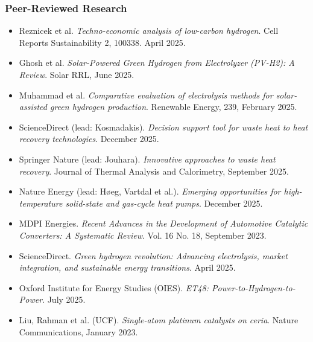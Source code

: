 \documentclass[11pt,letterpaper]{article}
\begin{document}
\subsubsection{Peer-Reviewed Research}
\begin{itemize}
  \item Reznicek et al. \textit{Techno-economic analysis of low-carbon hydrogen}. Cell Reports Sustainability 2, 100338. April 2025.
  \item Ghosh et al. \textit{Solar-Powered Green Hydrogen from Electrolyzer (PV-H2): A Review}. Solar RRL, June 2025.
  \item Muhammad et al. \textit{Comparative evaluation of electrolysis methods for solar-assisted green hydrogen production}. Renewable Energy, 239, February 2025.
  \item ScienceDirect (lead: Kosmadakis). \textit{Decision support tool for waste heat to heat recovery technologies}. December 2025.
  \item Springer Nature (lead: Jouhara). \textit{Innovative approaches to waste heat recovery}. Journal of Thermal Analysis and Calorimetry, September 2025.
  \item Nature Energy (lead: Høeg, Vartdal et al.). \textit{Emerging opportunities for high-temperature solid-state and gas-cycle heat pumps}. December 2025.
  \item MDPI Energies. \textit{Recent Advances in the Development of Automotive Catalytic Converters: A Systematic Review}. Vol. 16 No. 18, September 2023.
  \item ScienceDirect. \textit{Green hydrogen revolution: Advancing electrolysis, market integration, and sustainable energy transitions}. April 2025.
  \item Oxford Institute for Energy Studies (OIES). \textit{ET48: Power-to-Hydrogen-to-Power}. July 2025.
  \item Liu, Rahman et al. (UCF). \textit{Single-atom platinum catalysts on ceria}. Nature Communications, January 2023.
\end{itemize}
\end{document}
